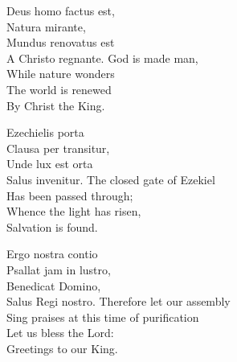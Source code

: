 \newcommand{\betweenLilyPondSystem}[1]{\linebreak}


\setlength{\preverseskip}{3pt}

\vskip-1pt
Deus homo factus est,\\
Natura mirante,\\
Mundus renovatus est\\
A Christo regnante.
\divverse
God is made man,\\
While nature wonders\\
The world is renewed\\
By Christ the King.
\finishverse


Ezechielis porta\\
Clausa per transitur,\\
Unde lux est orta\\
Salus invenitur.
\divverse
The closed gate of Ezekiel\\
Has been passed through;\\
Whence the light has risen,\\
Salvation is found.
\finishverse


Ergo nostra contio\\
Psallat jam in lustro,\\
Benedicat Domino,\\
Salus Regi nostro.
\divverse
Therefore let our assembly\\
Sing praises at this time of purification\\
Let us bless the Lord:\\
Greetings to our King.
\finishverse


\setlength{\preverseskip}{10pt}
